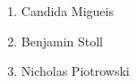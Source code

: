 \begin{enumerate}
    \item Candida Migueis
    \item Benjamin Stoll
    \item Nicholas Piotrowski
\end{enumerate}
